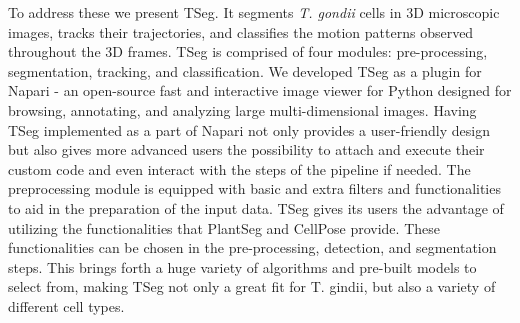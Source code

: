\documentclass[./dissertation.tex]{subfiles}
\begin{document}
To address these we present TSeg. It segments \textit{T. gondii} cells in 3D microscopic images, tracks their trajectories, and classifies the motion patterns observed throughout the 3D frames. TSeg is comprised of four modules: pre-processing, segmentation, tracking, and classification. We developed TSeg as a plugin for Napari \cite{sofroniew_nicholas_2022_6598542} - an open-source fast and interactive image viewer for Python designed for browsing, annotating, and analyzing large multi-dimensional images. Having TSeg implemented as a part of Napari not only provides a user-friendly design but also gives more advanced users the possibility to attach and execute their custom code and even interact with the steps of the pipeline if needed. The preprocessing module is equipped with basic and extra filters and functionalities to aid in the preparation of the input data. TSeg gives its users the advantage of utilizing the functionalities that PlantSeg and CellPose provide. These functionalities can be chosen in the pre-processing, detection, and segmentation steps. This brings forth a huge variety of algorithms and pre-built models to select from, making TSeg not only a great fit for T. gindii, but also a variety of different cell types.

\end{document}
